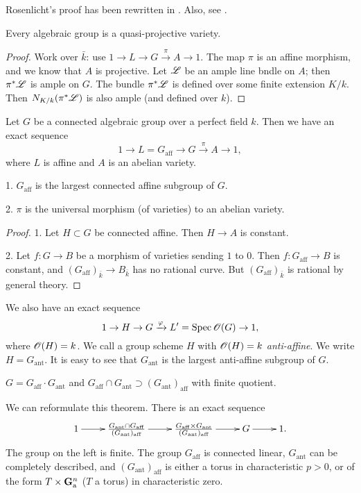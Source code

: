 Rosenlicht's proof has been rewritten in \cite{bsu13}. Also, see 
\cite{m14}. 

\begin{coro}
Every algebraic group is a quasi-projective variety. 
\end{coro}
\begin{proof}
Work over $\bar k$: use $1 \to L\to  G \xrightarrow\pi A \to 1$. The map 
$\pi$ is an affine morphism, and we know that $A$ is projective. Let $\mathscr{L}$ 
be an ample line bndle on $A$; then $\pi^\ast\mathscr{L}$ is ample on $G$. The 
bundle $\pi^\ast\mathscr{L}$ is defined over some finite extension $K/k$. Then 
$N_{K/k}(\pi^\ast \mathscr{L})$ is also ample (and defined over $k$). 
\end{proof}

Let $G$ be a connected algebraic group over a perfect field $k$. Then we 
have an exact sequence 
\[
  1 \to L=G_\mathrm{aff} \to G \xrightarrow\pi A \to 1 ,
\]
where $L$ is affine and $A$ is an abelian variety. 

\begin{prop}
1. $G_\mathrm{aff}$ is the largest connected affine subgroup of $G$. 

2. $\pi$ is the universal morphism (of varieties) to an abelian variety. 
\end{prop}
\begin{proof}
1. Let $H\subset G$ be connected affine. Then $H\to A$ is constant. 

2. Let $f:G\to B$ be a morphism of varieties sending $1$ to $0$. Then 
$f:G_\mathrm{aff} \to B$ is constant, and 
$(G_\mathrm{aff})_{\bar k} \to B_{\bar k}$ has no rational curve. But 
$(G_\mathrm{aff})_{\bar k}$ is rational by general theory. 
\end{proof}

We also have an exact sequence 
\[
  1 \to H \to G \xrightarrow\varphi L' =\operatorname{Spec}\mathscr{O}(G) \to 1 ,
\]
where $\mathscr{O}(H)=k$. We call a group scheme $H$ with 
$\mathscr{O}(H)=k$ \emph{anti-affine}. We write $H=G_\mathrm{ant}$. It is easy to 
see that $G_\mathrm{ant}$ is the largest anti-affine subgroup of $G$. 

\begin{prop}[Rosenlicht]
$G=G_\mathrm{aff}\cdot G_\mathrm{ant}$ and 
$G_\mathrm{aff}\cap G_\mathrm{ant}\supset (G_\mathrm{ant})_\mathrm{aff}$ with 
finite quotient. 
\end{prop}

We can reformulate this theorem. There is an exact sequence 
\[\xymatrix{
  1 \ar[r] 
    & \frac{G_\mathrm{ant}\cap G_\mathrm{aff}}{(G_\mathrm{ant})_\mathrm{aff}} \ar[r] 
    & \frac{G_\mathrm{aff}\times G_\mathrm{ant}}{(G_\mathrm{ant})_\mathrm{aff}} \ar[r] 
    & G \ar[r] 
    & 1 .
}\]
The group on the left is finite. The group $G_\mathrm{aff}$ is connected 
linear, $G_\mathrm{ant}$ can be completely described, and 
$(G_\mathrm{ant})_\mathrm{aff}$ is either a torus in characteristic $p>0$, or 
of the form $T\times \mathbf{G}_{\mathrm{a}}^n$ ($T$ a torus) in characteristic zero. 

